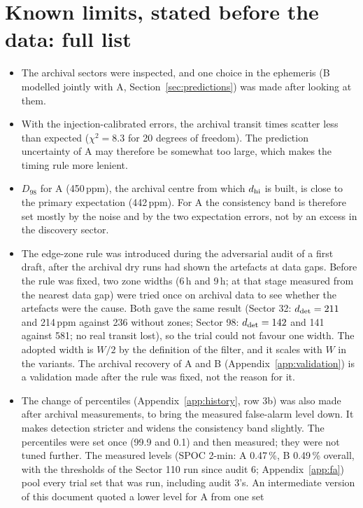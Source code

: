 \section{Known limits, stated before the data: full list} \label{app:limits}

\begin{itemize}
\item The archival sectors were inspected, and one choice in the ephemeris (B modelled jointly with A,
  Section~\ref{sec:predictions}) was made after looking at them.
\item With the injection-calibrated errors, the archival transit times scatter less than expected ($\chi^2 = 8.3$ for
  20 degrees of freedom). The prediction uncertainty of A may therefore be somewhat too large, which makes the timing
  rule more lenient.
\item $D_{98}$ for A (450\,ppm), the archival centre from which $d_{\rm hi}$ is built, is close to the primary expectation
  (442\,ppm). For A the consistency band is therefore set mostly by the noise and by the two expectation errors, not by
  an excess in the discovery sector.
\item The edge-zone rule was introduced during the adversarial audit of a first draft, after the archival dry runs had
  shown the artefacts at data gaps. Before the rule was fixed, two zone widths (6\,h and 9\,h; at that stage measured from the
  nearest data gap) were tried once on archival data to see whether the artefacts were the cause. Both gave the same
  result (Sector 32: $d_{\rm det} = 211$ and 214\,ppm against 236 without zones; Sector 98: $d_{\rm det} = 142$ and 141 against
  581; no real transit lost), so the trial could not favour one width. The adopted width is $W/2$ by the definition of
  the filter, and it scales with $W$ in the variants. The archival recovery of A and B (Appendix~\ref{app:validation}) is
  a validation made after the rule was fixed, not the reason for it.
\item The change of percentiles (Appendix~\ref{app:history}, row 3b) was also made after archival measurements, to bring
  the measured false-alarm level down. It makes detection stricter and widens the consistency band slightly. The percentiles were set once
  (99.9 and 0.1) and then measured; they were not tuned further. The measured levels (SPOC 2-min: A 0.47\,\%, B
  0.49\,\% overall, with the thresholds of the Sector 110 run since audit 6; Appendix~\ref{app:fa}) pool every trial set
  that was run, including audit 3's. An intermediate version of this document quoted a lower level for A from one set

\end{itemize}

